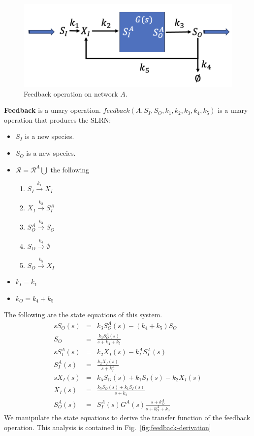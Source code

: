 \documentclass[unnumsec,webpdf,contemporary,large]{oup-authoring-template}%
\theoremstyle{thmstyleone}%
\theoremstyle{thmstyletwo}%
\theoremstyle{thmstylethree}%
\begin{document}
\begin{figure}
         \centering
         \includegraphics[scale=0.4]{figures/feedback.png}
          \caption[]{Feedback operation on network $A$.}
         \label{fig:concatenate}
\end{figure}
{\bf Feedback} is a unary operation.
$feedback(A, S_I, S_O, k_1, k_2, k_3, k_4, k_5)$ is a unary operation that produces
the SLRN:
\begin{itemize}
\item $S_I$ is a new species.
\item $S_O$ is a new species.
\item $\mathcal{R} = \mathcal{R}^A \bigcup$ the following
\begin{enumerate}
\item $S_I \xrightarrow{k_1} X_I$
\item $X_I \xrightarrow{k_2} S^A_I$
\item $S^A_O \xrightarrow{k_3} S_O$
\item $S_O \xrightarrow{k_4} \emptyset$
\item $S_O \xrightarrow{k_5} X_I$
\end{enumerate}
\item $k_I = k_1$
\item $k_O = k_4 + k_5$
\end{itemize}

The following are the state equations of this system.
\begin{eqnarray}
s S_O (s) & = & k_3 S^A_O (s) - (k_4 + k_5) S_O \nonumber \\
S_O & = & \frac{k_3 S^A_O(s)}{s + k_4 + k_5} \\
s S^A_I(s) & = & k_2 X_I(s) - k^A_I S^A_I(s) \nonumber \\
S^A_I(s) & = & \frac{k_2 X_I(s)}{s + k^A_I} \\
s X_I (s) & = & k_5 S_O(s) + k_1 S_I (s) - k_2 X_I (s) \nonumber \\
X_I(s) & = & \frac{k_5 S_O(s) + k_1 S_I (s)}{s + k_2} \\
S^A_O(s) & = & S^A_I(s) G^A(s) \frac{s + k^A_O}{s + k^A_O + k_3}
\end{eqnarray}
We manipulate the state equations to derive the transfer function of
the feedback operation.
This analysis is contained in
Fig.~\ref{fig:feedback-derivation}
\end{document}
